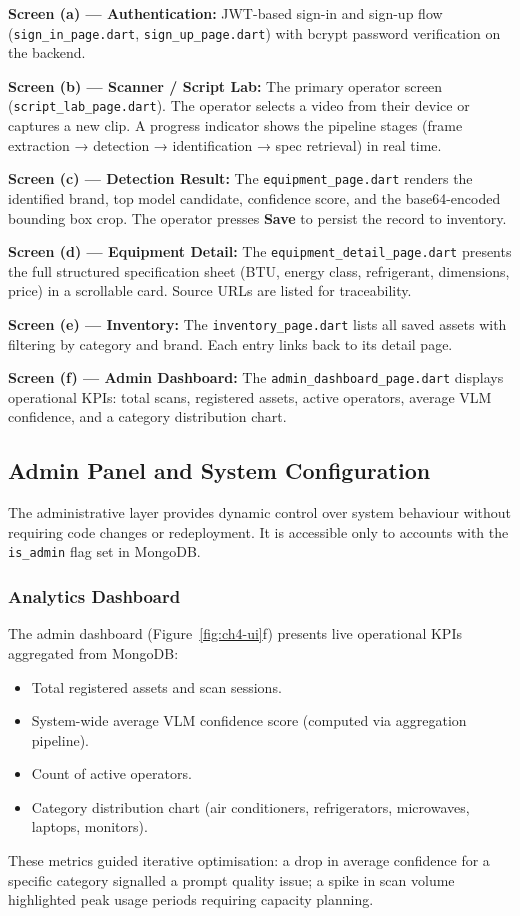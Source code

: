 \textbf{Screen (a) — Authentication:} JWT-based sign-in and sign-up flow (\texttt{sign\_in\_page.dart}, \texttt{sign\_up\_page.dart}) with bcrypt password verification on the backend.

\textbf{Screen (b) — Scanner / Script Lab:} The primary operator screen (\texttt{script\_lab\_page.dart}). The operator selects a video from their device or captures a new clip. A progress indicator shows the pipeline stages (frame extraction → detection → identification → spec retrieval) in real time.

\textbf{Screen (c) — Detection Result:} The \texttt{equipment\_page.dart} renders the identified brand, top model candidate, confidence score, and the base64-encoded bounding box crop. The operator presses \textbf{Save} to persist the record to inventory.

\textbf{Screen (d) — Equipment Detail:} The \texttt{equipment\_detail\_page.dart} presents the full structured specification sheet (BTU, energy class, refrigerant, dimensions, price) in a scrollable card. Source URLs are listed for traceability.

\textbf{Screen (e) — Inventory:} The \texttt{inventory\_page.dart} lists all saved assets with filtering by category and brand. Each entry links back to its detail page.

\textbf{Screen (f) — Admin Dashboard:} The \texttt{admin\_dashboard\_page.dart} displays operational KPIs: total scans, registered assets, active operators, average VLM confidence, and a category distribution chart.

\subsection{Admin Panel and System Configuration}

The administrative layer provides dynamic control over system behaviour without requiring code changes or redeployment. It is accessible only to accounts with the \texttt{is\_admin} flag set in MongoDB.

\subsubsection{Analytics Dashboard}
The admin dashboard (Figure~\ref{fig:ch4-ui}f) presents live operational KPIs aggregated from MongoDB:
\begin{itemize}
  \item Total registered assets and scan sessions.
  \item System-wide average VLM confidence score (computed via aggregation pipeline).
  \item Count of active operators.
  \item Category distribution chart (air conditioners, refrigerators, microwaves, laptops, monitors).
\end{itemize}
These metrics guided iterative optimisation: a drop in average confidence for a specific category signalled a prompt quality issue; a spike in scan volume highlighted peak usage periods requiring capacity planning.

